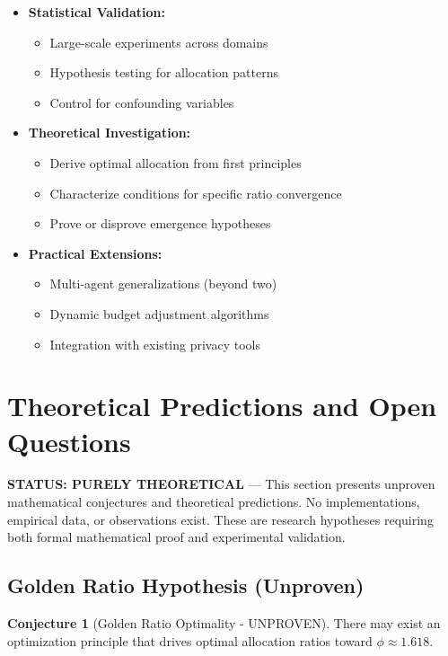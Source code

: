 \documentclass[11pt,a4paper]{article}
\theoremstyle{definition}
\newtheorem{conjecture}{Conjecture}[section]
\begin{document}
\begin{itemize}
    \item \textbf{Statistical Validation:}
    \begin{itemize}
        \item Large-scale experiments across domains
        \item Hypothesis testing for allocation patterns
        \item Control for confounding variables
    \end{itemize}
    \item \textbf{Theoretical Investigation:}
    \begin{itemize}
        \item Derive optimal allocation from first principles
        \item Characterize conditions for specific ratio convergence
        \item Prove or disprove emergence hypotheses
    \end{itemize}
    \item \textbf{Practical Extensions:}
    \begin{itemize}
        \item Multi-agent generalizations (beyond two)
        \item Dynamic budget adjustment algorithms
        \item Integration with existing privacy tools
    \end{itemize}
\end{itemize}

\section{Theoretical Predictions and Open Questions}

\textbf{STATUS: PURELY THEORETICAL} --- This section presents unproven mathematical conjectures and theoretical predictions. No implementations, empirical data, or observations exist. These are research hypotheses requiring both formal mathematical proof and experimental validation.

\subsection{Golden Ratio Hypothesis (Unproven)}

\begin{conjecture}[Golden Ratio Optimality - UNPROVEN]\label{conj:golden}
There may exist an optimization principle that drives optimal allocation ratios toward $\phi \approx 1.618$.
\end{conjecture}
\end{document}
